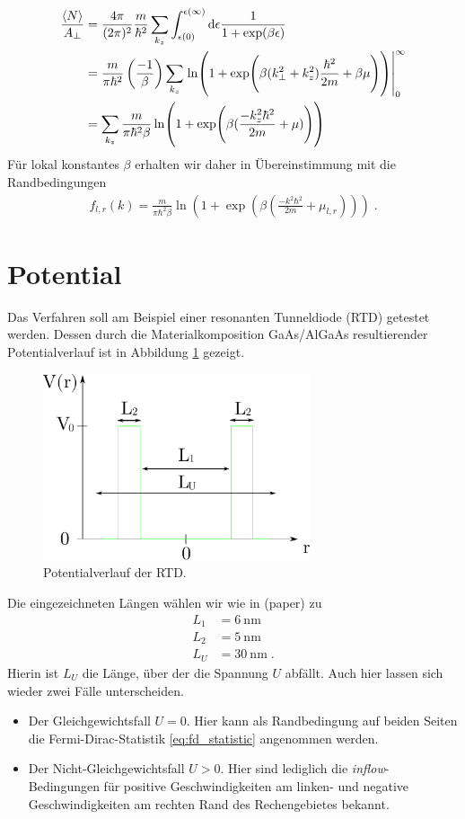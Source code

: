 \begin{align}
  \frac{\expval{N}}{A_{\perp}} &= \frac{4\pi}{(2\pi)^2} \frac{m}{\hbar^2} \sum_{k_z} \int_{\epsilon(0)}^{{\epsilon(\infty)}} \mathop{}\!\mathrm{d} \epsilon \frac{1}{1+\exp(\beta\epsilon)} \\
    &= \frac{m}{\pi\hbar^2}\left( \frac{-1}{\beta}\right) \sum_{k_z} \left.\ln(1+\exp(\beta(k_{\perp}^2 + k_z^2)\frac{\hbar^2}{2m} + \beta\mu))\right|_0^{\infty} \\
    &= \sum_{k_z} \frac{m}{\pi\hbar^2\beta} \ln(1+\exp(\beta(\frac{- k_z^2\hbar^2}{2m} + \mu)))
\end{align}
Für lokal konstantes $\beta$ erhalten wir daher in Übereinstimmung mit \cite{frensley2} die Randbedingungen
\begin{align}
  f_{l,r} (k) = \frac{m}{\pi\hbar^2\beta} \ln(1+\exp(\beta(\frac{- k^2\hbar^2}{2m} + \mu_{l,r}))) \; .
\end{align}


\section{Potential}
Das Verfahren soll am Beispiel einer resonanten Tunneldiode (RTD) getestet werden. Dessen durch die Materialkomposition GaAs/AlGaAs resultierender Potentialverlauf ist in Abbildung \ref{fig:pot1} gezeigt.
\begin{figure}
  \centering
  \includegraphics[width=0.7\textwidth]{plots/potential.pdf}
  \caption{Potentialverlauf der RTD.}
  \label{fig:pot1}
\end{figure}
Die eingezeichneten Längen wählen wir wie in (paper) zu
\begin{align}
  L_1 &= \SI{6}{\nano\meter}\\
  L_2 &= \SI{5}{\nano\meter}\\
  L_U &= \SI{30}{\nano\meter} \; .
\end{align}
Hierin ist $L_U$ die Länge, über der die Spannung $U$ abfällt. Auch hier lassen sich wieder zwei Fälle unterscheiden.
\begin{itemize}
  \item Der Gleichgewichtsfall $U=0$. Hier kann als Randbedingung auf beiden Seiten die Fermi-Dirac-Statistik \ref{eq:fd_statistic} angenommen werden.
  \item Der Nicht-Gleichgewichtsfall $U>0$. Hier sind lediglich die \emph{inflow}-Bedingungen für positive Geschwindigkeiten am linken- und negative Geschwindigkeiten am rechten Rand des Rechengebietes bekannt.
\end{itemize}

